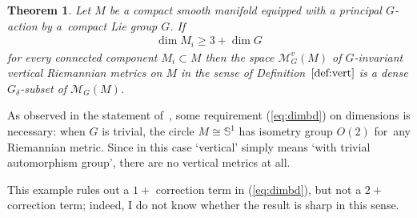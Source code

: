 \documentclass[pdftex]{sigma}%
\numberwithin{equation}{section}
\newtheorem{Theorem}{Theorem}[section]
\begin{document}
\begin{Theorem}\label{th:equirig}
 Let $M$ be a compact smooth manifold equipped with a principal $G$-action by a~compact Lie group $G$. If
 \begin{gather}\label{eq:dimbd}
 \dim M_i\ge 3+\dim G
 \end{gather}
 for every connected component $M_i\subset M$ then the space $\mathcal{M}^v_G(M)$ of $G$-invariant vertical Riemannian metrics on $M$ in the sense of Definition~$\ref{def:vert}$ is a dense $G_{\delta}$-subset of $\mathcal{M}_G(M)$.
\end{Theorem}

\begin{Remark}%
 As observed in the statement of~\cite[Proposition~8.3]{eb}, some requirement (\ref{eq:dimbd}) on dimensions is necessary: when $G$ is trivial, the circle $M\cong \mathbb{S}^1$ has isometry group $O(2)$ for~any Riemannian metric. Since in this case `vertical' simply means `with trivial automorphism group', there are no vertical metrics at all.

 This example rules out a $1+$ correction term in (\ref{eq:dimbd}), but not a $2+$ correction term; indeed, I do not know whether the result is sharp in this sense.
\end{Remark}
\end{document}
